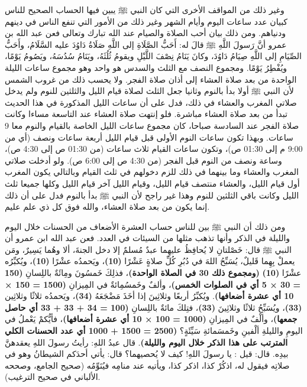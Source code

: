 وغير ذلك من المواقف الأخرى التي كان النبي ﷺ يبين فيها الحساب الصحيح للناس كبيان عدد ساعات اليوم وأيام الشهر وغير ذلك من الأمور التي تنفع الناس في دينهم ودنياهم. ومن ذلك بيان أحب الصلاة والصيام عند الله تبارك وتعالى فعن عبد الله بن عمرو أنَّ رَسولَ اللَّهِ ﷺ قالَ له: أَحَبُّ الصَّلَاةِ إلى اللَّهِ صَلَاةُ دَاوُدَ عليه السَّلَامُ، وأَحَبُّ الصِّيَامِ إلى اللَّهِ صِيَامُ دَاوُدَ، وكانَ يَنَامُ نِصْفَ اللَّيْلِ ويقومُ ثُلُثَهُ، ويَنَامُ سُدُسَهُ، ويَصُومُ يَوْمًا، ويُفْطِرُ يَوْمًا. ومجموع النصف مع الثلث والسدس هو واحد وهو مجموع ساعات الليلة الواحدة من بعد صلاة العشاء إلى أذان صلاة الفجر. ولا يحسب ذلك من غروب الشمس لأن النبي ﷺ أولا بدأ بالنوم وثانيا جعل الثلث لصلاة قيام الليل والثلثين للنوم ولم يدخل صلاتي المغرب والعشاء في ذلك، فدل على أن ساعات الليل المذكورة في هذا الحديث تبدأ من بعد صلاة العشاء مباشرة. فلو إنتهت صلاة العشاء عند التاسعة مساءا وكانت صلاة الفجر عند السادسة صباحا، كان مجموع ساعات الليل الخاصة بالقيام والنوم معا 9 ساعات. وبهذا تكون ساعات النوم الأولى قبل قيام الليل أربعة ساعات ونصف (أي من 9:00 م إلى 01:30 ص)، وتكون ساعات القيام ثلاث ساعات (من 01:30 ص إلى 4:30 ص)، وساعة ونصف من النوم قبل الفجر (من 4:30 ص إلى 6:00 ص). ولو أدخلت صلاتي المغرب والعشاء وما بينهما في ذلك للزم دخولهم في ثلث القيام وبالتالي يكون المغرب أول قيام الليل، والعشاء منتصف قيام الليل، وقيام الليل آخر قيام الليل وكلها جميعا ثلث الليل وكانت باقي الثلثين للنوم وهذا غير راجح لأن النبي ﷺ بدأ بالنوم فدل على أن ذلك إنما يكون من بعد صلاة العشاء، والله فوق كل ذي علم عليم.

ومن ذلك أن النبي ﷺ بين للناس حساب العشرة الأضعاف من الحسنات خلال اليوم والليلة في الذكر وأنها تذهب مثلها من السيئات في العدد. فعن عبد الله ابن عمرو أن النبي ﷺ قال: خَصْلتانِ لا يُحافِظُ عليهِما عبدٌ مُسلمٌ إلا دخل الجنةَ، ألا وهُما يَسِيرٌ، ومَن يعملْ بِهِما قَليلٌ، يُسَبِّحُ اللهَ في دُبُرِ كُلِّ صلاةٍ عَشْرًا \textbf{\small(10)}، ويَحمدُه عشْرًا \textbf{\small(10)}، ويُكبِّرُه عشْرًا \textbf{\small(10)} \textbf{\small(ومجموع ذلك 30 في الصلاة الواحدة)}، فذلِكَ خَمسُونَ ومِائَةٌ باللِسانِ \textbf{\small(150 = 30 × 5 أي في الصلوات الخمس)}، وألفٌ وخَمسُمِائةٌ في المِيزانِ \textbf{\small(1500 = 150 × 10 أي عشرة أضعافها)}. ويُكبِّرُ أربعًا وثلاثِينَ إذا أخَذَ مَضْجَعَهُ \textbf{\small(34)}، ويَحمدُه ثلاثًا وثلاثِين \textbf{\small(33)}، ويُسَبِّحُ ثلاثًا وثلاثِينَ \textbf{\small(33)}، فتِلكَ مائةٌ باللِسانِ \textbf{\small(100 = 34 + 33 + 33 أي حاصل جمعها)}، وألْفٌ في المِيزانِ \textbf{\small(1000 = 100 × 10 أي عشرة أضعافها)}، فأيُّكمْ يَعْملُ في اليومِ والليلةِ ألْفينِ وخَمسَمائةِ سَيِّئَةٍ؟ \textbf{\small(2500 = 1500 + 1000 أي عدد الحسنات الكلي المترتب على هذا الذكر خلال اليوم والليلة)}. قال عبدُ اللهِ: رأيتُ رسولَ اللهِ يعقدهنَّ بيدِه. قال: قيل : يا رسولَ اللهِ! كيف لا يُحصيهما؟ قال: يأتي أحدَكم الشيطانُ وهو في صلاتِه فيقول له، اذكُرْ كذا، اذكر كذا، ويأتيه عند منامِه فيُنَوِّمُه {\footnotesize (صحيح الجامع، وصححه الألباني في صحيح الترغيب)}. 

